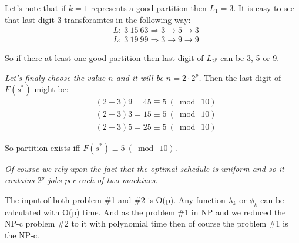 \documentclass{amsart}
\begin{document}
Let's note that if $k=1$ represents a good partition then $L_1=3$.
It is easy to see that last digit 3 transforamtes in the following way:
\begin{align*}
  & L:\ 3\ 15\ 63 \Rightarrow 3 \to 5 \to 3 \\
  & L:\ 3\ 19\ 99 \Rightarrow 3 \to 9 \to 9
\end{align*}

So if there at least one good partition
then last digit of $L_{2^p}$ can be 3, 5 or 9.

{\it Let's finaly choose the value $n$ and it will be $n=2\cdot2^p$.}
Then the last digit of $F(s^*)$ might be:
\begin{align*}
  & (2 + 3) 9 = 45 \equiv 5\ (\bmod\ 10) \\
  & (2 + 3) 3 = 15 \equiv 5\ (\bmod\ 10) \\
  & (2 + 3) 5 = 25 \equiv 5\ (\bmod\ 10)
\end{align*}

So partition exists iff $F(s^*) \equiv 5\ (\bmod\ 10)$.

{\it
  Of course we rely upon the fact that the optimal schedule is uniform
  and so it contains $2^p$ jobs per each of two machines.
}

The input of both problem \#1 and \#2 is O(p). Any function $\lambda_k$
or $\phi_k$ can be calculated with O(p) time.
And as the problem \#1 in NP and we reduced the NP-c problem \#2 to it
with polynomial time then of course the problem \#1 is the NP-c.
\end{document}
